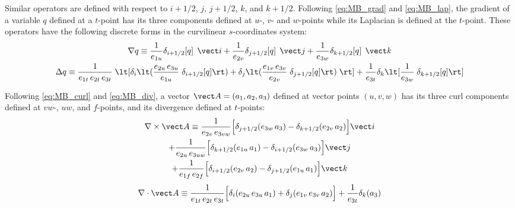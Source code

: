 \documentclass[../main/NEMO_manual]{subfiles}
\begin{document}
Similar operators are defined with respect to $i + 1/2$, $j$, $j + 1/2$, $k$, and $k + 1/2$.
Following \autoref{eq:MB_grad} and \autoref{eq:MB_lap},
the gradient of a variable $q$ defined at a $t$-point has
its three components defined at $u$-, $v$- and $w$-points while
its Laplacian is defined at the $t$-point.
These operators have the following discrete forms in the curvilinear $s$-coordinates system:
\begin{gather*}
  \nabla q \equiv   \frac{1}{e_{1u}} \delta_{i + 1/2} [q] \; \, \vect i
                  + \frac{1}{e_{2v}} \delta_{j + 1/2} [q] \; \, \vect j
                  + \frac{1}{e_{3w}} \delta_{k + 1/2} [q] \; \, \vect k \\
  \Delta q \equiv   \frac{1}{e_{1t} \, e_{2t} \, e_{3t}}
                    \; \lt[   \delta_i \lt( \frac{e_{2u} \, e_{3u}}{e_{1u}} \; \delta_{i + 1/2} [q] \rt)
                            + \delta_j \lt( \frac{e_{1v} \, e_{3v}}{e_{2v}} \; \delta_{j + 1/2} [q] \rt) \; \rt]
                  + \frac{1}{e_{3t}}
                              \delta_k \lt[ \frac{1              }{e_{3w}} \; \delta_{k + 1/2} [q] \rt]
\end{gather*}

Following \autoref{eq:MB_curl} and \autoref{eq:MB_div},
a vector $\vect A = (a_1,a_2,a_3)$ defined at vector points $(u,v,w)$ has
its three curl components defined at $vw$-, $uw$, and $f$-points, and
its divergence defined at $t$-points:
\begin{multline*}
  \nabla \times \vect A \equiv   \frac{1}{e_{2v} \, e_{3vw}}
                                 \Big[   \delta_{j + 1/2} (e_{3w} \, a_3)
                                       - \delta_{k + 1/2} (e_{2v} \, a_2) \Big] \vect i \\
                               + \frac{1}{e_{2u} \, e_{3uw}}
                                 \Big[   \delta_{k + 1/2} (e_{1u} \, a_1)
                                       - \delta_{i + 1/2} (e_{3w} \, a_3) \Big] \vect j \\
                               + \frac{1}{e_{1f} \, e_{2f}}
                                 \Big[   \delta_{i + 1/2} (e_{2v} \, a_2)
                                       - \delta_{j + 1/2} (e_{1u} \, a_1) \Big] \vect k
\end{multline*}
\[
  \nabla \cdot \vect A \equiv   \frac{1}{e_{1t} \, e_{2t} \, e_{3t}}
                                \Big[ \delta_i (e_{2u} \, e_{3u} \, a_1) + \delta_j (e_{1v} \, e_{3v} \, a_2) \Big]
                              + \frac{1}{e_{3t}} \delta_k (a_3)
\]
\end{document}
